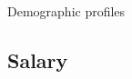 \documentclass[12pt]{beamer}
\begin{document}
\begin{frame}{\textcolor{bscuro}{Demographic profiles}}
\begin{figure}[!ht] 
	\centering
	
\end{figure}
\end{frame}

\subsection{Salary}
\end{document}
